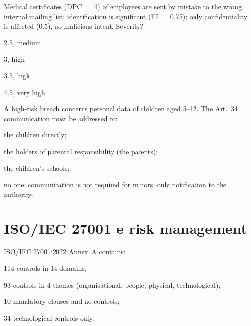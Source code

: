 \begin{domanda}\label{q:severita-salute}
Medical certificates (DPC~=~4) of employees are sent by mistake to the wrong internal mailing list;
identification is significant (EI~=~0.75); only confidentiality is affected (0.5), no malicious intent.
Severity?
\begin{opzioni}
  \item 2.5, medium
  \item 3, high
  \item 3.5, high
  \item 4.5, very high
\end{opzioni}
\end{domanda}

\begin{domanda}\label{q:minori}
A high-risk breach concerns personal data of children aged 5--12. The Art.~34 communication must be
addressed to:
\begin{opzioni}
  \item the children directly;
  \item the holders of parental responsibility (the parents);
  \item the children's schools;
  \item no one: communication is not required for minors, only notification to the authority.
\end{opzioni}
\end{domanda}

\section{ISO/IEC 27001 e risk management}

\begin{domanda}\label{q:annexa}
ISO/IEC 27001:2022 Annex~A contains:
\begin{opzioni}
  \item 114 controls in 14 domains;
  \item 93 controls in 4 themes (organisational, people, physical, technological);
  \item 10 mandatory clauses and no controls;
  \item 34 technological controls only.
\end{opzioni}
\end{domanda}

